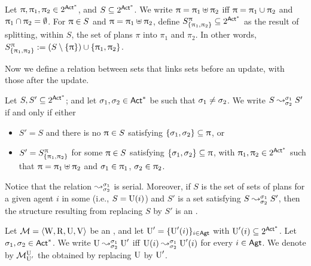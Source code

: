 
\medskip

\begin{definition}
Let $\plans, \plans_1, \plans_2 \in 2^{\ACT^*}$, and $S \subseteq 2^{\ACT^*}$.  We write $\plans = \plans_1\uplus\plans_2$ iff $\plans=\plans_1\cup\plans_2$ and $\plans_1\cap\plans_2=\emptyset$.
For $\plans \in S$ and $\plans=\plans_1\uplus\plans_2$, define  $\lmodel{S}{\plans}{\set{\plans_1,\plans_2}} \subseteq 2^{\ACT^*}$ as the result of splitting, within $S$, the set of plans $\pi$ into $\pi_1$ and $\pi_2$. In other words, $\lmodel{S}{\plans}{\set{\plans_1,\plans_2}} := (S\setminus\set{\plans})\cup\set{\plans_1,\plans_2}$.
\end{definition}

\medskip

Now we define a relation between sets that links sets before an update, with those after the update.

\medskip

\begin{definition}\label{def:splitstr}
Let $S,S' \subseteq 2^{\ACT^*}$; and let $\plan_1,\plan_2 \in \ACT^*$ be such that $\plan_1\neq\plan_2$.
We write $\splitstr{S}{S'}{\plan_1}{\plan_2}$ if and only if either
\begin{itemize} \itemsep 0cm
\item $S' = S$ and there is no $\plans\in S$ satisfying $\set{\plan_1, \plan_2} \subseteq \plans$, or
\item $S' = \lmodel{S}{\plans}{\set{\plans_1,\plans_2}}$ for some $\plans \in S$ satisfying $\set{\plan_1, \plan_2} \subseteq \plans$, with $\plans_1, \plans_2 \in 2^{\ACT^*}$ such that
$\plans = \plans_1\uplus\plans_2$ and
$\plan_1 \in \plans_1$, $\plan_2 \in \plans_2$.
\end{itemize}
\end{definition}

\medskip

Notice that the relation $\splitstr{}{}{\plan_1}{\plan_2}$ is serial. Moreover, if $S$ is the set of sets of plans for a given agent $i$ in some \ults (i.e., $S=\Unc(i)$) and $S'$ is a set satisfying $\splitstr{S}{S'}{\plan_1}{\plan_2}$, then the structure resulting from replacing $S$ by $S'$ is an \ults.

\medskip

\begin{definition}
Let $\modults=\tup{\W,\R,\Unc,\V}$ be an \ults, and let $\Unc'=\set{\Unc'(i)}_{i\in\AGT}$ with ${\Unc'(i)\subseteq 2^{\ACT^*}}$.
Let $\plan_1,\plan_2 \in \ACT^*$. We write $\splitstr{\Unc}{\Unc'}{\plan_1}{\plan_2}$ iff $\splitstr{\Unc(i)}{\Unc'(i)}{\plan_1}{\plan_2}$ for every $i\in\AGT$.
We denote by $\modults^{\Unc}_{\Unc'}$ the \ults obtained by replacing $\Unc$ by $\Unc'$.
\end{definition}

